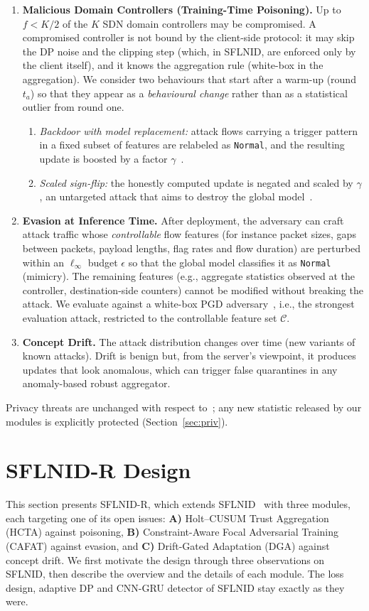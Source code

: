 \documentclass[journal]{IEEEtran}
\begin{document}
\begin{enumerate}
\item \textbf{Malicious Domain Controllers (Training-Time Poisoning).} Up to $f<K/2$ of the $K$ SDN domain controllers may be compromised. A compromised controller is not bound by the client-side protocol: it may skip the DP noise and the clipping step (which, in SFLNID, are enforced only by the client itself), and it knows the aggregation rule (white-box in the aggregation). We consider two behaviours that start after a warm-up (round $t_a$) so that they appear as a \emph{behavioural change} rather than as a statistical outlier from round one.
\begin{enumerate}
\item \emph{Backdoor with model replacement:} attack flows carrying a trigger pattern in a fixed subset of features are relabeled as \texttt{Normal}, and the resulting update is boosted by a factor $\gamma$~\cite{bagdasaryan}.
\item \emph{Scaled sign-flip:} the honestly computed update is negated and scaled by $\gamma$, an untargeted attack that aims to destroy the global model~\cite{fang}.
\end{enumerate}
\item \textbf{Evasion at Inference Time.} After deployment, the adversary can craft attack traffic whose \emph{controllable} flow features (for instance packet sizes, gaps between packets, payload lengths, flag rates and flow duration) are perturbed within an $\ell_\infty$ budget $\epsilon$ so that the global model classifies it as \texttt{Normal} (mimicry). The remaining features (e.g., aggregate statistics observed at the controller, destination-side counters) cannot be modified without breaking the attack. We evaluate against a white-box PGD adversary~\cite{madry}, i.e., the strongest evaluation attack, restricted to the controllable feature set $\mathcal{C}$.
\item \textbf{Concept Drift.} The attack distribution changes over time (new variants of known attacks). Drift is benign but, from the server's viewpoint, it produces updates that look anomalous, which can trigger false quarantines in any anomaly-based robust aggregator.
\end{enumerate}
Privacy threats are unchanged with respect to~\cite{sflnid}; any new statistic released by our modules is explicitly protected (Section~\ref{sec:priv}).

\section{SFLNID-R Design}\label{sec:design}
This section presents SFLNID-R, which extends SFLNID~\cite{sflnid} with three modules, each targeting one of its open issues: \textbf{A)} Holt--CUSUM Trust Aggregation (HCTA) against poisoning, \textbf{B)} Constraint-Aware Focal Adversarial Training (CAFAT) against evasion, and \textbf{C)} Drift-Gated Adaptation (DGA) against concept drift. We first motivate the design through three observations on SFLNID, then describe the overview and the details of each module. The loss design, adaptive DP and CNN-GRU detector of SFLNID stay exactly as they were.
\end{document}
